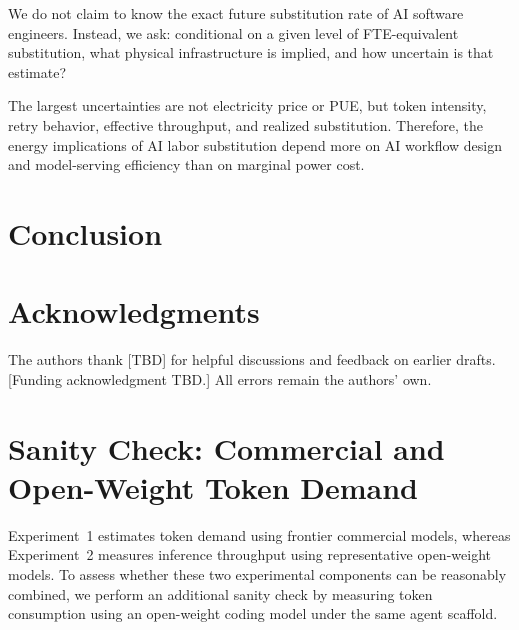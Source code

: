 \documentclass{article}
\begin{document}


We do not claim to know the exact future substitution rate of AI software engineers. Instead, we ask: conditional on a given level of FTE-equivalent substitution, what physical infrastructure is implied, and how uncertain is that estimate?

The largest uncertainties are not electricity price or PUE, but token intensity, retry behavior, effective throughput, and realized substitution. Therefore, the energy implications of AI labor substitution depend more on AI workflow design and model-serving efficiency than on marginal power cost.


\section{Conclusion}
\label{sec:conclusion}



\section*{Acknowledgments}

The authors thank [TBD] for helpful discussions and feedback on earlier drafts. [Funding
acknowledgment TBD.] All errors remain the authors' own.




\appendix

\section{Sanity Check: Commercial and Open-Weight Token Demand}
\label{app:sanity}

Experiment~1 estimates token demand using frontier commercial models,
whereas Experiment~2 measures inference throughput using representative
open-weight models. To assess whether these two experimental components
can be reasonably combined, we perform an additional sanity check by
measuring token consumption using an open-weight coding model under the
same agent scaffold.
\end{document}

